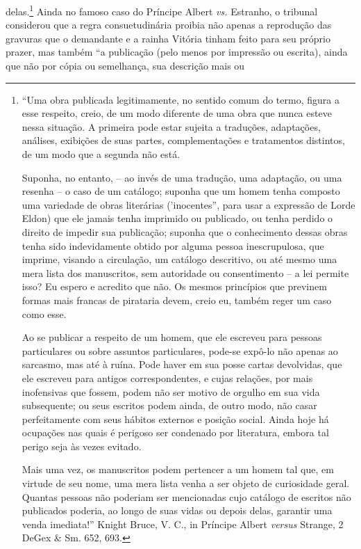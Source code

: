 delas.\footnote{``Uma obra publicada legitimamente, no sentido comum do
  termo, figura a esse respeito, creio, de um modo diferente de uma obra
  que nunca esteve nessa situação. A primeira pode estar sujeita a
  traduções, adaptações, análises, exibições de suas partes,
  complementações e tratamentos distintos, de um modo que a segunda não
  está.

  Suponha, no entanto, -- ao invés de uma tradução, uma adaptação, ou
  uma resenha -- o caso de um catálogo; suponha que um homem tenha
  composto uma variedade de obras literárias ('inocentes'', para usar a
  expressão de Lorde Eldon) que ele jamais tenha imprimido ou publicado,
  ou tenha perdido o direito de impedir sua publicação; suponha que o
  conhecimento dessas obras tenha sido indevidamente obtido por alguma
  pessoa inescrupulosa, que imprime, visando a circulação, um catálogo
  descritivo, ou até mesmo uma mera lista dos manuscritos, sem
  autoridade ou consentimento -- a lei permite isso? Eu espero e
  acredito que não. Os mesmos princípios que previnem formas mais
  francas de pirataria devem, creio eu, também reger um caso como esse.

  Ao se publicar a respeito de um homem, que ele escreveu para pessoas
  particulares ou sobre assuntos particulares, pode-se expô-lo não
  apenas ao sarcasmo, mas até à ruína. Pode haver em sua posse cartas
  devolvidas, que ele escreveu para antigos correspondentes, e cujas
  relações, por mais inofensivas que fossem, podem não ser motivo de
  orgulho em sua vida subsequente; ou seus escritos podem ainda, de
  outro modo, não casar perfeitamente com seus hábitos externos e
  posição social. Ainda hoje há ocupações nas quais é perigoso ser
  condenado por literatura, embora tal perigo seja às vezes evitado.

  Mais uma vez, os manuscritos podem pertencer a um homem tal que, em
  virtude de seu nome, uma mera lista venha a ser objeto de curiosidade
  geral. Quantas pessoas não poderiam ser mencionadas cujo catálogo de
  escritos não publicados poderia, ao longo de suas vidas ou depois
  delas, garantir uma venda imediata!'' Knight Bruce, V. C., in Príncipe
  Albert \emph{versus} Strange, 2 DeGex \& Sm. 652, 693.} Ainda no
famoso caso do Príncipe Albert \emph{vs.} Estranho, o tribunal
considerou que a regra consuetudinária proibia não apenas a reprodução
das gravuras que o demandante e a rainha Vitória tinham feito para seu
próprio prazer, mas também ``a publicação (pelo menos por impressão ou
escrita), ainda que não por cópia ou semelhança, sua descrição mais ou
